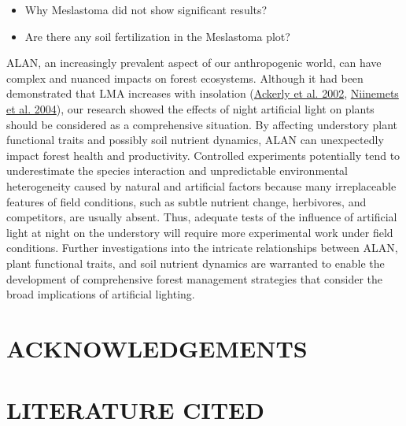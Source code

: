 \documentclass[
  12pt,
  letterpaper,
  DIV=11,
  numbers=noendperiod]{scrartcl}
\providecommand{\tightlist}{%
  \setlength{\itemsep}{0pt}\setlength{\parskip}{0pt}}\usepackage{longtable,booktabs,array}
\begin{document}
\begin{itemize}
\tightlist
\item
  Why Meslastoma did not show significant results?
\item
  Are there any soil fertilization in the Meslastoma plot?
\end{itemize}

ALAN, an increasingly prevalent aspect of our anthropogenic world, can
have complex and nuanced impacts on forest ecosystems. Although it had
been demonstrated that LMA increases with insolation
(\protect\hyperlink{ref-Ackerly2002}{Ackerly et al. 2002},
\protect\hyperlink{ref-Niinemets2004}{Niinemets et al. 2004}), our
research showed the effects of night artificial light on plants should
be considered as a comprehensive situation. By affecting understory
plant functional traits and possibly soil nutrient dynamics, ALAN can
unexpectedly impact forest health and productivity. Controlled
experiments potentially tend to underestimate the species interaction
and unpredictable environmental heterogeneity caused by natural and
artificial factors because many irreplaceable features of field
conditions, such as subtle nutrient change, herbivores, and competitors,
are usually absent. Thus, adequate tests of the influence of artificial
light at night on the understory will require more experimental work
under field conditions. Further investigations into the intricate
relationships between ALAN, plant functional traits, and soil nutrient
dynamics are warranted to enable the development of comprehensive forest
management strategies that consider the broad implications of artificial
lighting.

\hypertarget{acknowledgements}{%
\section{ACKNOWLEDGEMENTS}\label{acknowledgements}}

\hypertarget{literature-cited}{%
\section{LITERATURE CITED}\label{literature-cited}}
\end{document}
